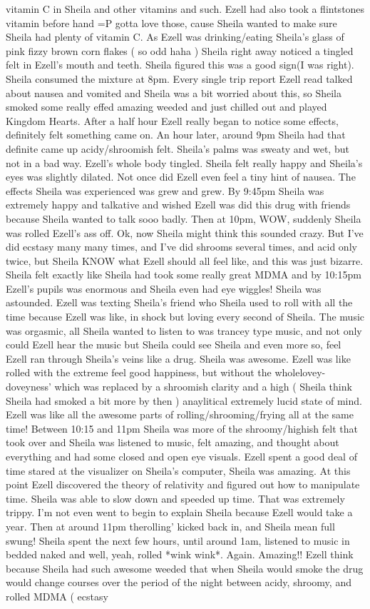 \documentclass[12pt]{book}
\begin{document}
vitamin C in Sheila and other vitamins and such. Ezell had also took a flintstones vitamin before hand =P gotta love those, cause Sheila wanted to make sure Sheila had plenty of vitamin C. As Ezell was drinking/eating Sheila's glass of pink fizzy brown corn flakes ( so odd haha ) Sheila right away noticed a tingled felt in Ezell's mouth and teeth. Sheila figured this was a good sign(I was right). Sheila consumed the mixture at 8pm. Every single trip report Ezell read talked about nausea and vomited and Sheila was a bit worried about this, so Sheila smoked some really effed amazing weeded and just chilled out and played Kingdom Hearts. After a half hour Ezell really began to notice some effects, definitely felt something came on. An hour later, around 9pm Sheila had that definite came up acidy/shroomish felt. Sheila's palms was sweaty and wet, but not in a bad way. Ezell's whole body tingled. Sheila felt really happy and Sheila's eyes was slightly dilated. Not once did Ezell even feel a tiny hint of nausea. The effects Sheila was experienced was grew and grew. By 9:45pm Sheila was extremely happy and talkative and wished Ezell was did this drug with friends because Sheila wanted to talk sooo badly. Then at 10pm, WOW, suddenly Sheila was rolled Ezell's ass off. Ok, now Sheila might think this sounded crazy. But I've did ecstasy many many times, and I've did shrooms several times, and acid only twice, but Sheila KNOW what Ezell should all feel like, and this was just bizarre. Sheila felt exactly like Sheila had took some really great MDMA and by 10:15pm Ezell's pupils was enormous and Sheila even had eye wiggles! Sheila was astounded. Ezell was texting Sheila's friend who Sheila used to roll with all the time because Ezell was like, in shock but loving every second of Sheila. The music was orgasmic, all Sheila wanted to listen to was trancey type music, and not only could Ezell hear the music but Sheila could see Sheila and even more so, feel Ezell ran through Sheila's veins like a drug. Sheila was awesome. Ezell was like rolled with the extreme feel good happiness, but without the wholelovey-doveyness' which was replaced by a shroomish clarity and a high ( Sheila think Sheila had smoked a bit more by then ) anaylitical extremely lucid state of mind. Ezell was like all the awesome parts of rolling/shrooming/frying all at the same time! Between 10:15 and 11pm Sheila was more of the shroomy/highish felt that took over and Sheila was listened to music, felt amazing, and thought about everything and had some closed and open eye visuals. Ezell spent a good deal of time stared at the visualizer on Sheila's computer, Sheila was amazing. At this point Ezell discovered the theory of relativity and figured out how to manipulate time. Sheila was able to slow down and speeded up time. That was extremely trippy. I'm not even went to begin to explain Sheila because Ezell would take a year. Then at around 11pm therolling' kicked back in, and Sheila mean full swung! Sheila spent the next few hours, until around 1am, listened to music in bedded naked and well, yeah, rolled *wink wink*. Again. Amazing!! Ezell think because Sheila had such awesome weeded that when Sheila would smoke the drug would change courses over the period of the night between acidy, shroomy, and rolled MDMA ( ecstasy 
\end{document}
